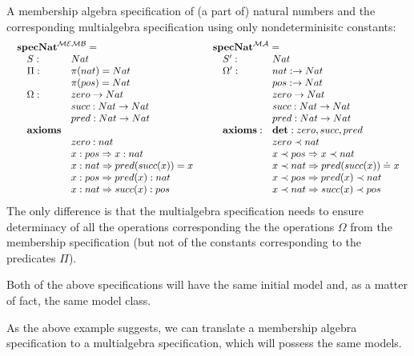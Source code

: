 \documentclass[10pt]{article}
\begin{document}
\begin{example}
A membership algebra specification of (a part of) natural numbers and the
corresponding multialgebra specification using only nondeterminisitc constants:
{\small{\[ \begin{array}{ll}
\begin{array}[t]{lll}
	\multicolumn{3}{l}{{\bf spec Nat}^{\inst{MEMB}}= }\\
		&S:
			 & Nat\\
		&\Pi:
			 & \pi(nat) = Nat\\
			&& \pi(pos) = Nat\\
		&\Omega:
			 & zero \to Nat\\
			&& succ:Nat \to Nat\\
			&& pred:Nat \to Nat\\
		&{\bf axioms} \\
			&& zero:nat\\
			&& x:pos \To x:nat\\
			&& x:nat \To pred(succ(x))=x\\
			&& x:pos \To pred(x):nat\\	
			&& x:nat \To succ(x):pos\\
\end{array}
&
\begin{array}[t]{lll}
		\multicolumn{3}{l}{ {\bf spec Nat}^{\inst{MA}}= }\\
		&S':
			 & Nat\\
		&\Omega':
			& nat: \to Nat\\
			&& pos: \to Nat\\
			&& zero \to Nat\\
			&& succ:Nat \to Nat\\
			&& pred:Nat \to Nat\\
		&{\bf axioms:}
			 & {\bf det}: zero, succ, pred \\
			&& zero \prec nat\\	
			&& x \prec pos \To x \prec nat\\
			&& x\prec nat \To pred(succ(x))\eleq x\\
			&& x \prec pos \To pred(x) \prec nat\\
			&& x \prec nat \To succ(x) \prec pos\\
\end{array}
\end{array}
\] }}
The only difference is that the multialgebra specification needs to ensure
determinacy of all the operations corresponding the the operations $\Omega$ from
the membership specification (but not of the constants corresponding to the
predicates $\Pi$).

Both of the above specifications will have the same initial model and, as
a matter of fact, the same model class.
\end{example}
%
As the
above example suggests, we can translate a membership algebra specification to
a multialgebra specification, which will possess the same models.
\end{document}
